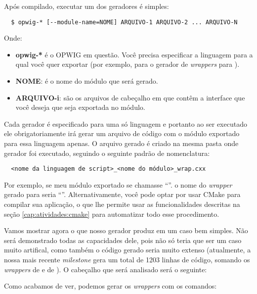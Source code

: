 Após compilado, executar um dos geradores é simples:
\begin{verbatim}
  $ opwig-* [--module-name=NOME] ARQUIVO-1 ARQUIVO-2 ... ARQUIVO-N
\end{verbatim}

Onde:
\begin{itemize}
  \item \textbf{opwig-*} é o OPWIG em questão. Você precisa especificar a
        linguagem para a qual você quer exportar (por exemplo, 
        para o gerador de \textit{wrappers} para ).
  \item \textbf{NOME}: é o nome do módulo que será gerado.
  \item \textbf{ARQUIVO-i}: são os arquivos de cabeçalho em \CXX{} que contêm a interface
        que você deseja que seja exportada no módulo.
\end{itemize}

Cada gerador é especificado para uma só linguagem e portanto ao ser executado
ele obrigatoriamente irá gerar um arquivo de código com o módulo exportado para
essa linguagem apenas. O arquivo gerado é criado na mesma pasta onde gerador foi
executado, seguindo o seguinte padrão de nomenclatura:

\begin{verbatim}
  <nome da linguagem de script>_<nome do módulo>_wrap.cxx
\end{verbatim}

Por exemplo, se meu módulo exportado se chamasse ``''. o nome
do \textit{wrapper} gerado para  seria ``''.
Alternativamente, você pode optar por usar CMake para compilar sua aplicação, o que
lhe permite usar as funcionalidades descritas na seção \ref{cap:atividades:cmake}
para automatizar todo esse procedimento.

Vamos mostrar agora o que nosso gerador produz em um caso bem simples. Não será
demonstrado todas as capacidades dele, pois não só teria que ser um caso muito
artifical, como também o código gerado seria muito extenso (atualmente, a nossa
mais recente \textit{milestone} gera um total de 1203 linhas de código, somando
os \textit{wrappers} de  e de ). O cabeçalho que será
analisado será o seguinte:

\vspace{1em}

\vspace{1em}

Como acabamos de ver, podemos gerar os \textit{wrappers} com os comandos:

